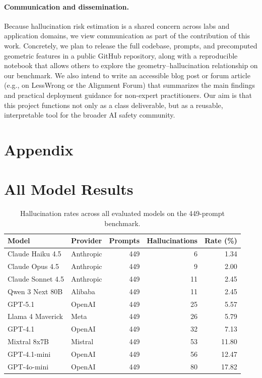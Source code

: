 \documentclass{article}
\begin{document}
\paragraph{Communication and dissemination.} Because hallucination risk estimation is a shared concern across labs and application domains, we view communication as part of the contribution of this work. Concretely, we plan to release the full codebase, prompts, and precomputed geometric features in a public GitHub repository, along with a reproducible notebook that allows others to explore the geometry--hallucination relationship on our benchmark. We also intend to write an accessible blog post or forum article (e.g., on LessWrong or the Alignment Forum) that summarizes the main findings and practical deployment guidance for non-expert practitioners. Our aim is that this project functions not only as a class deliverable, but as a reusable, interpretable tool for the broader AI safety community.





\section{Appendix}

\appendix

\section{All Model Results}
\label{app:all-model-results}

\begin{table}[H]
    \centering
    \caption{Hallucination rates across all evaluated models on the 449-prompt benchmark.}
    \label{tab:all-model-results}
    \begin{tabular}{l l r r r}
        \toprule
        Model & Provider & Prompts & Hallucinations & Rate (\%) \\
        \midrule
        Claude Haiku 4.5   & Anthropic & 449 &  6 &  1.34 \\
        Claude Opus 4.5    & Anthropic & 449 &  9 &  2.00 \\
        Claude Sonnet 4.5  & Anthropic & 449 & 11 &  2.45 \\
        Qwen 3 Next 80B    & Alibaba   & 449 & 11 &  2.45 \\
        GPT-5.1            & OpenAI    & 449 & 25 &  5.57 \\
        Llama 4 Maverick   & Meta      & 449 & 26 &  5.79 \\
        GPT-4.1            & OpenAI    & 449 & 32 &  7.13 \\
        Mixtral 8x7B       & Mistral   & 449 & 53 & 11.80 \\
        GPT-4.1-mini       & OpenAI    & 449 & 56 & 12.47 \\
        GPT-4o-mini        & OpenAI    & 449 & 80 & 17.82 \\
        \bottomrule
    \end{tabular}
\end{table}
\end{document}
